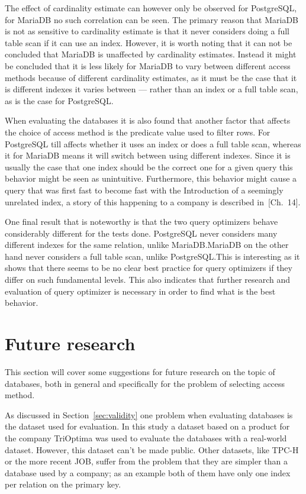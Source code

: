 The effect of cardinality estimate can however only be observed for PostgreSQL,
for MariaDB no such correlation can be seen. The primary reason that MariaDB is
not as sensitive to cardinality estimate is that it never considers doing a full
table scan if it can use an index. However, it is worth noting that it can not
be concluded that MariaDB is unaffected by cardinality estimates. Instead it
might be concluded that it is less likely for MariaDB to vary between different
access methods because of different cardinality estimates, as it must be the
case that it is different indexes it varies between --- rather than an index or
a full table scan, as is the case for PostgreSQL.\@

When evaluating the databases it is also found that another factor that affects
the choice of access method is the predicate value used to filter rows. For
PostgreSQL till affects whether it uses an index or does a full table scan,
whereas it for MariaDB means it will switch between using different indexes.
Since it is usually the case that one index should be the correct one for a
given query this behavior might be seen as unintuitive. Furthermore, this
behavior might cause a query that was first fast to become fast with the
Introduction of a seemingly unrelated index, a story of this happening to a
company is described in~\cite{lahdenmaki_2005_relational_rdidatodossea}[Ch.~14].

One final result that is noteworthy is that the two query optimizers behave
considerably different for the tests done. PostgreSQL never considers
many different indexes for the same relation, unlike MariaDB.\@ MariaDB on the
other hand never considers a full table scan, unlike PostgreSQL.\@ This is
interesting as it shows that there seems to be no clear best practice for query
optimizers if they differ on such fundamental levels. This also indicates that
further research and evaluation of query optimizer is necessary in order to find
what is the best behavior.

\section{Future research}
This section will cover some suggestions for future research on the topic of
databases, both in general and specifically for the problem of selecting access method.

As discussed in Section~\ref{sec:validity} one problem when evaluating
databases is the dataset used for evaluation. In this study a dataset based on a
product for the company TriOptima was used to evaluate the databases with a real-world
dataset. However, this dataset can't be made public. Other datasets, like TPC-H
or the more recent JOB, suffer from the problem that they are simpler
than a database used by a company; as an example both of them have only one
index per relation on the primary key.

